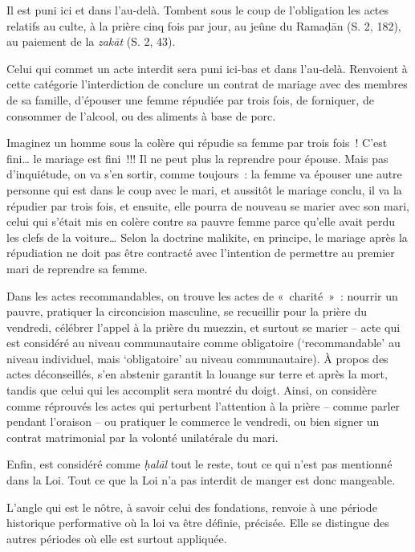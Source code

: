  Il est puni ici et dans l'au-delà. Tombent
sous le coup de l'obligation les actes relatifs au culte, à la prière
cinq fois par jour, au jeûne du Ramaḍān (S. 2, 182), au paiement de la
\emph{zakāt} (S. 2, 43).

Celui qui commet un acte interdit sera puni ici-bas et dans l'au-delà.
Renvoient à cette catégorie l'interdiction de conclure un contrat de
mariage avec des membres de sa famille, d'épouser une femme répudiée par
trois fois, de forniquer, de consommer de l'alcool, ou des aliments à
base de porc.
\begin{Ex}
Imaginez un homme sous la colère qui répudie sa femme par
trois fois~! C'est fini\ldots{} le mariage est fini~!!! Il ne peut plus
la reprendre pour épouse. Mais pas d'inquiétude, on va s'en sortir,
comme toujours~: la femme va épouser une autre personne qui est dans le
coup avec le mari, et aussitôt le mariage conclu, il va la répudier par
trois fois, et ensuite, elle pourra de nouveau se marier avec son mari,
celui qui s'était mis en colère contre sa pauvre femme parce qu'elle
avait perdu les clefs de la voiture\ldots{} Selon la doctrine malikite,
en principe, le mariage après la répudiation ne doit pas être contracté
avec l'intention de permettre au premier mari de reprendre sa femme.

\end{Ex}

Dans les actes recommandables, on trouve les actes de «~charité~»~:
nourrir un pauvre, pratiquer la circoncision masculine, se recueillir
pour la prière du vendredi, célébrer l'appel à la prière du muezzin, et
surtout se marier -- acte qui est considéré au niveau communautaire
comme obligatoire (`recommandable' au niveau individuel, mais
`obligatoire' au niveau communautaire). 
À propos des actes déconseillés,
s'en abstenir garantit la louange sur terre et après la mort, tandis que
celui qui les accomplit sera montré du doigt. Ainsi, on considère comme
réprouvés les actes qui perturbent l'attention à la prière -- comme
parler pendant l'oraison -- ou pratiquer le commerce le vendredi, ou
bien signer un contrat matrimonial par la volonté unilatérale du mari.

Enfin, est considéré comme \emph{ḥalāl} tout le reste, tout ce qui n'est
pas mentionné dans la Loi. Tout ce que la Loi n'a pas interdit de manger
est donc mangeable.

L'angle qui est le nôtre, à savoir celui des fondations, renvoie à une
période historique performative où la loi va être définie, précisée.
Elle se distingue des autres périodes où elle est surtout appliquée.


